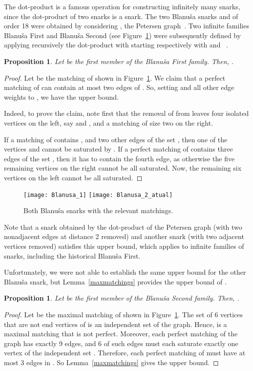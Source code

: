 \documentclass{article}
\newtheorem{proposition}[thm]{Proposition}
\begin{document}
The dot-product is a famous operation for constructing infinitely many snarks, since the dot-product of two snarks is a snark. The two Blanu\v{s}a snarks  and  of order 18 were obtained by considering , the Petersen graph~\cite{Blanusa}. Two infinite families Blanu\v{s}a First and Blanu\v{s}a Second (see Figure~\ref{fig:B1}) were subsequently defined by applying recursively the dot-product with  starting respectively with  and ~\cite{Watkins}.

\begin{proposition}\label{B1}
Let  be the first member of the Blanu\v{s}a First family. Then, .
\end{proposition}
\begin{proof}
Let  be the matching of  shown in Figure~\ref{fig:B1}. We claim that a perfect matching of  can contain at most two edges of . So, setting  and all other edge weights to , we have the upper bound.

Indeed, to prove the claim, note first that the removal of  from 
leaves four isolated vertices on the left, say  and ,
and a matching of size two on the right.

If a matching  of  contains , and two other edges of the set
,
then one of the vertices  and  cannot be saturated by .
If a perfect matching of  contains three edges of the set , then it has to contain the fourth edge,
as otherwise the five remaining vertices on the right cannot be all
saturated. Now, the remaining six vertices on the left cannot be all
saturated.
\end{proof}

\begin{figure}[ht]
\centering
\texttt{[image: Blanusa\_1]} \hspace{.5cm} \texttt{[image: Blanusa\_2\_atual]}
\caption{Both Blanu\v{s}a snarks with the relevant matchings.}
\label{fig:B1}
\end{figure}

Note that a snark obtained by the dot-product of the Petersen graph (with two nonadjacent edges at distance 2 removed) and another snark (with two adjacent vertices removed) satisfies this upper bound, which applies to infinite families of snarks, including the historical Blanu\v{s}a First.

Unfortunately, we were not able to establish the same upper bound  for the other Blanu\v{s}a snark, but Lemma~\ref{maxmatchings} provides the upper bound of .

\begin{proposition}\label{B2}
Let  be the first member of the Blanu\v{s}a Second family. Then, .
\end{proposition}
\begin{proof}
Let  be the maximal matching of  shown in Figure~\ref{fig:B1}. The set  of 6 vertices that are not end vertices of  is an independent set of the graph. Hence,  is a maximal matching that is not perfect. Moreover, each perfect matching of the graph has exactly 9 edges, and 6 of such edges must each saturate exactly one vertex of the independent set . Therefore, each perfect matching of  must have at most 3 edges in . So Lemma~\ref{maxmatchings} gives the upper bound.
\end{proof}
\end{document}
